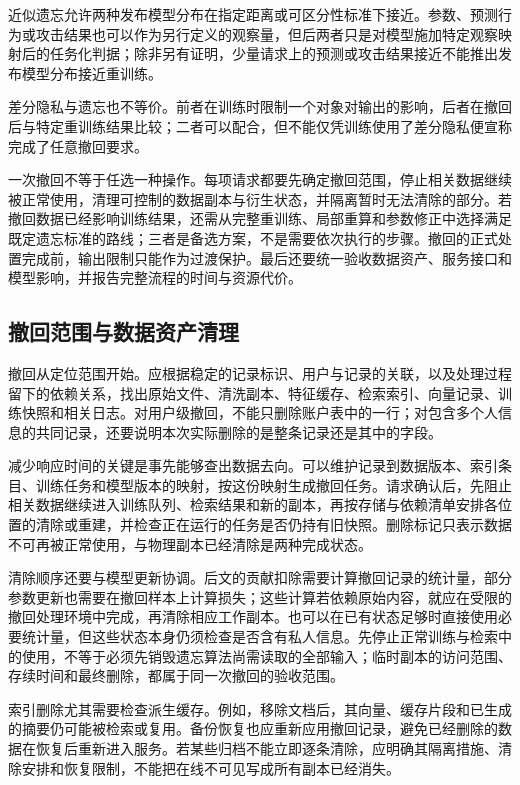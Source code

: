近似遗忘允许两种发布模型分布在指定距离或可区分性标准下接近。参数、预测行为或攻击结果也可以作为另行定义的观察量，但后两者只是对模型施加特定观察映射后的任务化判据；除非另有证明，少量请求上的预测或攻击结果接近不能推出发布模型分布接近重训练。

差分隐私与遗忘也不等价。前者在训练时限制一个对象对输出的影响，后者在撤回后与特定重训练结果比较；二者可以配合，但不能仅凭训练使用了差分隐私便宣称完成了任意撤回要求。

一次撤回不等于任选一种操作。每项请求都要先确定撤回范围，停止相关数据继续被正常使用，清理可控制的数据副本与衍生状态，并隔离暂时无法清除的部分。若撤回数据已经影响训练结果，还需从完整重训练、局部重算和参数修正中选择满足既定遗忘标准的路线；三者是备选方案，不是需要依次执行的步骤。撤回的正式处置完成前，输出限制只能作为过渡保护。最后还要统一验收数据资产、服务接口和模型影响，并报告完整流程的时间与资源代价。

\subsection{撤回范围与数据资产清理}
\label{sec:privacy-asset-deletion}

撤回从定位范围开始。应根据稳定的记录标识、用户与记录的关联，以及处理过程留下的依赖关系，找出原始文件、清洗副本、特征缓存、检索索引、向量记录、训练快照和相关日志。对用户级撤回，不能只删除账户表中的一行；对包含多个人信息的共同记录，还要说明本次实际删除的是整条记录还是其中的字段。

减少响应时间的关键是事先能够查出数据去向。可以维护记录到数据版本、索引条目、训练任务和模型版本的映射，按这份映射生成撤回任务。请求确认后，先阻止相关数据继续进入训练队列、检索结果和新的副本，再按存储与依赖清单安排各位置的清除或重建，并检查正在运行的任务是否仍持有旧快照。删除标记只表示数据不可再被正常使用，与物理副本已经清除是两种完成状态。

清除顺序还要与模型更新协调。后文的贡献扣除需要计算撤回记录的统计量，部分参数更新也需要在撤回样本上计算损失；这些计算若依赖原始内容，就应在受限的撤回处理环境中完成，再清除相应工作副本。也可以在已有状态足够时直接使用必要统计量，但这些状态本身仍须检查是否含有私人信息。先停止正常训练与检索中的使用，不等于必须先销毁遗忘算法尚需读取的全部输入；临时副本的访问范围、存续时间和最终删除，都属于同一次撤回的验收范围。

索引删除尤其需要检查派生缓存。例如，移除文档后，其向量、缓存片段和已生成的摘要仍可能被检索或复用。备份恢复也应重新应用撤回记录，避免已经删除的数据在恢复后重新进入服务。若某些归档不能立即逐条清除，应明确其隔离措施、清除安排和恢复限制，不能把在线不可见写成所有副本已经消失。


